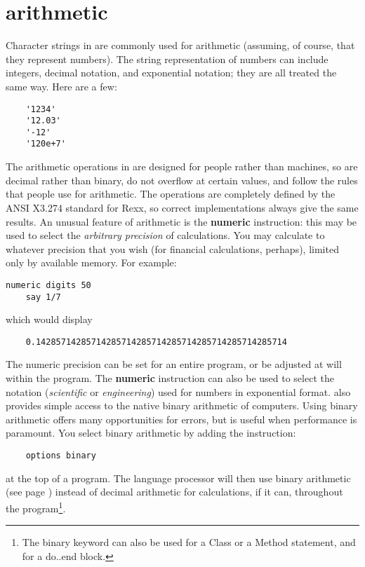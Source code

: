 \section{\nr{} arithmetic}
Character strings in \nr{} are commonly used for arithmetic
(assuming, of course, that they represent numbers). The string
representation of numbers can include integers, decimal notation,
and exponential notation; they are all treated the same way. Here are
a few:
\begin{lstlisting}
    '1234'
    '12.03'
    '-12'
    '120e+7'
\end{lstlisting}
The arithmetic operations in \nr{} are designed for people rather than machines, so are decimal rather than binary, do not overflow at certain values, and follow the rules that people use for arithmetic. The operations are completely defined by the ANSI X3.274 standard for Rexx, so correct implementations always give the same results.
An unusual feature of \nr{} arithmetic is the \textbf{numeric} instruction:
this may be used to select the \emph{arbitrary precision} of
calculations. You may calculate to whatever precision that you wish
(for financial calculations, perhaps), limited only by available
memory. For example:
\begin{lstlisting}[label=Digits,caption=Digits]
    numeric digits 50
    say 1/7
\end{lstlisting}
which would display
\begin{lstlisting}
    0.14285714285714285714285714285714285714285714285714
\end{lstlisting}
The numeric precision can be set for an entire program, or be adjusted at will within the program. The \textbf{numeric} instruction can also be used to select the notation (\emph{scientific} or \emph{engineering}) used for numbers in exponential format.
\nr{} also provides simple access to the native binary arithmetic of
computers. Using binary arithmetic offers many opportunities for
errors, but is useful when performance is paramount. You select binary
arithmetic by adding the instruction:
\begin{lstlisting}
    options binary
\end{lstlisting}
at the top of a \nr{} program. The language processor will then use
binary arithmetic (see page \pageref{binarith}) instead of \nr{}
decimal arithmetic for calculations, if it can, throughout the
program\footnote{The binary keyword can also be used for a Class or a
Method statement, and for a do..end block.}.
